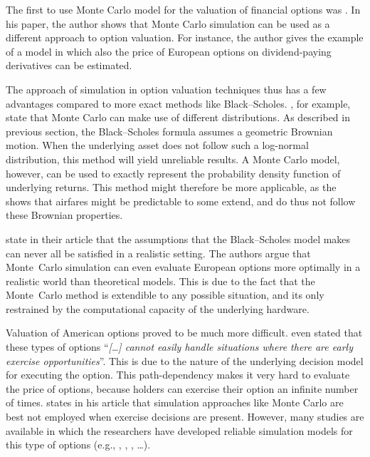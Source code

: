 The first to use Monte Carlo model for the valuation of financial options was . In his paper, the author shows that Monte Carlo simulation can be used as a different approach to option valuation. For instance, the author gives the example of a model in which also the price of European options on dividend-paying derivatives can be estimated.

The approach of simulation in option valuation techniques thus has a few advantages compared to more exact methods like Black--Scholes. , for example, state that Monte Carlo can make use of different distributions. As described in previous section, the Black--Scholes formula assumes a geometric Brownian motion. When the underlying asset does not follow such a log-normal distribution, this method will yield unreliable results. A Monte Carlo model, however, can be used to exactly represent the probability density function of underlying returns. This method might therefore be more applicable, as the  shows that airfares might be predictable to some extend, and do thus not follow these Brownian properties.

 state in their article that the assumptions that the Black--Scholes model makes can never all be satisfied in a realistic setting. The authors argue that Monte~Carlo simulation can even evaluate European options more optimally in a realistic world than theoretical models. This is due to the fact that the Monte~Carlo method is extendible to any possible situation, and its only restrained by the computational capacity of the underlying hardware.

Valuation of American options proved to be much more difficult.  even stated that these types of options ``\textit{[\ldots] cannot easily handle situations where there are early exercise opportunities}''. This is due to the nature of the underlying decision model for executing the option. This path-dependency makes it very hard to evaluate the price of options, because holders can exercise their option an infinite number of times.  states in his article that simulation approaches like Monte Carlo are best not employed when exercise decisions are present. However, many studies are available in which the researchers have developed reliable simulation models for this type of options (e.g., , , , \ldots).


